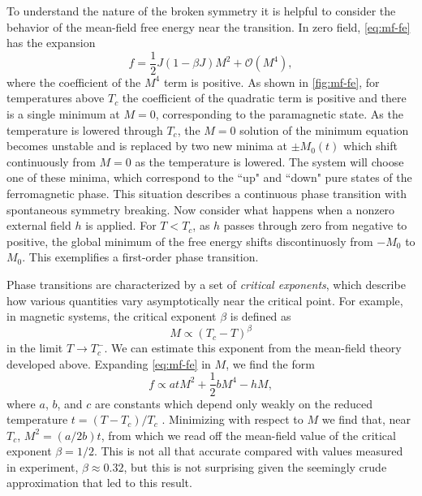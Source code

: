 To understand the nature of the broken symmetry it is helpful to consider the
behavior of the mean-field free energy near the transition. In zero field,
\cref{eq:mf-fe} has the expansion
\begin{equation}
  f = \frac{1}{2} J (1 - \beta J) M^2 + \mathcal{O}(M^4),
  \label{eq:mf-fe-trunc}
\end{equation}
where the coefficient of the $M^4$ term is positive. As shown in
\cref{fig:mf-fe}, for temperatures above $T_c$ the coefficient of the
quadratic term is positive and there is a single minimum at $M=0$,
corresponding to the paramagnetic state. As the temperature is lowered through
$T_c$, the $M=0$ solution of the minimum equation becomes unstable and is
replaced by two new minima at $\pm M_0(t)$ which shift continuously from $M=0$
as the temperature is lowered. The system will choose one of these minima,
which correspond to the ``up" and ``down" pure states of the ferromagnetic
phase. This situation describes a continuous phase transition with spontaneous
symmetry breaking. Now consider what happens when a nonzero external field $h$
is applied. For $T<T_c$, as $h$ passes through zero from negative to positive,
the global minimum of the free energy shifts discontinuosly from $-M_0$ to
$M_0$. This exemplifies a first-order phase transition.

Phase transitions are characterized by a set of \emph{critical exponents},
which describe how various quantities vary asymptotically near the critical
point. For example, in magnetic systems, the critical exponent $\beta$
is defined as
\begin{equation}
  M \propto (T_c - T)^{\beta}
\end{equation}
in the limit $T \to T_c^-$.
We can estimate this exponent from the mean-field theory developed above.
Expanding \cref{eq:mf-fe} in $M$, we find the form
\begin{equation}
  f \propto a t M^2 + \frac{1}{2} b M^4 - h M,
  \label{eq:mf-fe-form}
\end{equation}
where $a$, $b$, and $c$ are constants which depend only weakly on the reduced
temperature $t=(T-T_c)/T_c$ \autocite{cardy1996scaling}. Minimizing with
respect to $M$ we find that, near $T_c$, $M^2=(a/2b)t$, from which we read off
the mean-field value of the critical exponent $\beta=1/2$. This is not all that
accurate compared with values measured in experiment, $\beta \approx 0.32$, but
this is not surprising given the seemingly crude approximation that led to this
result.

